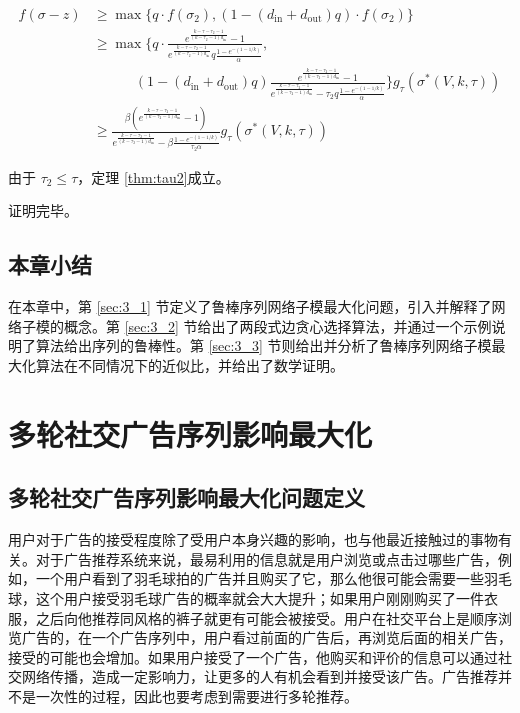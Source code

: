 \begin{align}
f(\sigma -z ) &\ge \max\{ q \cdot f(\sigma_2),(1-(d_{\text{in}} + d_{\text{out}})q) \cdot f(\sigma_2)\} \\
& \ge \max\{ q \cdot \frac{e^{\frac{k-\tau-\tau_2-1}{(k-\tau_2-1)d_{\text{in}}}}-1}{e^{\frac{k-\tau-\tau_2-1}{(k-\tau_2-1)d_{\text{in}}}} q \frac{1-e^{-(1-1/k)}}{\alpha} } ,\nonumber \\ &\quad \quad \quad (1-(d_{\text{in}} + d_{\text{out}})q) \frac{e^{\frac{k-\tau-\tau_2-1}{(k-\tau_2-1)d_{\text{in}}}}-1}{e^{\frac{k-\tau-\tau_2-1}{(k-\tau_2-1)d_{\text{in}}}}-\tau_2 q \frac{1-e^{-(1-1/k)}}{\alpha} } \} g_\tau(\sigma^*(V,k,\tau)) \\
& \ge \frac{\beta(e^{\frac{k-\tau-\tau_2-1}{(k-\tau_2-1)d_{\text{in}}}}-1)}{e^{\frac{k-\tau-\tau_2-1}{(k-\tau_2-1)d_{\text{in}}}}- \beta \frac{1-e^{-(1-1/k)}}{\tau_2\alpha} } g_\tau(\sigma^*(V,k,\tau))
\end{align}

由于 $\tau_2 \le \tau$，定理 \ref{thm:tau2}成立。

\noindent 证明完毕。


\section{本章小结}
在本章中，第 \ref{sec:3_1} 节定义了鲁棒序列网络子模最大化问题，引入并解释了网络子模的概念。第 \ref{sec:3_2} 节给出了两段式边贪心选择算法，并通过一个示例说明了算法给出序列的鲁棒性。第 \ref{sec:3_3} 节则给出并分析了鲁棒序列网络子模最大化算法在不同情况下的近似比，并给出了数学证明。


\chapter{多轮社交广告序列影响最大化}

\section{多轮社交广告序列影响最大化问题定义}
\label{sec:def}
用户对于广告的接受程度除了受用户本身兴趣的影响，也与他最近接触过的事物有关。对于广告推荐系统来说，最易利用的信息就是用户浏览或点击过哪些广告，例如，一个用户看到了羽毛球拍的广告并且购买了它，那么他很可能会需要一些羽毛球，这个用户接受羽毛球广告的概率就会大大提升；如果用户刚刚购买了一件衣服，之后向他推荐同风格的裤子就更有可能会被接受。用户在社交平台上是顺序浏览广告的，在一个广告序列中，用户看过前面的广告后，再浏览后面的相关广告，接受的可能也会增加。如果用户接受了一个广告，他购买和评价的信息可以通过社交网络传播，造成一定影响力，让更多的人有机会看到并接受该广告。广告推荐并不是一次性的过程，因此也要考虑到需要进行多轮推荐。

